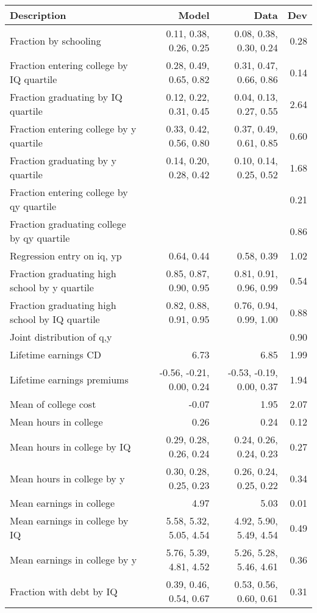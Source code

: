 \begin{tabular}{lrrr}
\hline
Description & Model  & Data  & Dev  \\ 
\hline
Fraction by schooling & 0.11, 0.38, 0.26, 0.25  & 0.08, 0.38, 0.30, 0.24  & 0.28  \\ 
Fraction entering college by IQ quartile & 0.28, 0.49, 0.65, 0.82  & 0.31, 0.47, 0.66, 0.86  & 0.14  \\ 
Fraction graduating by IQ quartile & 0.12, 0.22, 0.31, 0.45  & 0.04, 0.13, 0.27, 0.55  & 2.64  \\ 
Fraction entering college by y quartile & 0.33, 0.42, 0.56, 0.80  & 0.37, 0.49, 0.61, 0.85  & 0.60  \\ 
Fraction graduating by y quartile & 0.14, 0.20, 0.28, 0.42  & 0.10, 0.14, 0.25, 0.52  & 1.68  \\ 
Fraction entering college by qy quartile &   &   & 0.21  \\ 
Fraction graduating college by qy quartile &   &   & 0.86  \\ 
Regression entry on iq, yp & 0.64, 0.44  & 0.58, 0.39  & 1.02  \\ 
Fraction graduating high school by y quartile & 0.85, 0.87, 0.90, 0.95  & 0.81, 0.91, 0.96, 0.99  & 0.54  \\ 
Fraction graduating high school by IQ quartile & 0.82, 0.88, 0.91, 0.95  & 0.76, 0.94, 0.99, 1.00  & 0.88  \\ 
Joint distribution of q,y &   &   & 0.90  \\ 
Lifetime earnings CD & 6.73  & 6.85  & 1.99  \\ 
Lifetime earnings premiums & -0.56, -0.21, 0.00, 0.24  & -0.53, -0.19, 0.00, 0.37  & 1.94  \\ 
Mean of college cost & -0.07  & 1.95  & 2.07  \\ 
Mean hours in college & 0.26  & 0.24  & 0.12  \\ 
Mean hours in college by IQ & 0.29, 0.28, 0.26, 0.24  & 0.24, 0.26, 0.24, 0.23  & 0.27  \\ 
Mean hours in college by y & 0.30, 0.28, 0.25, 0.23  & 0.26, 0.24, 0.25, 0.22  & 0.34  \\ 
Mean earnings in college & 4.97  & 5.03  & 0.01  \\ 
Mean earnings in college by IQ & 5.58, 5.32, 5.05, 4.54  & 4.92, 5.90, 5.49, 4.54  & 0.49  \\ 
Mean earnings in college by y & 5.76, 5.39, 4.81, 4.52  & 5.26, 5.28, 5.46, 4.61  & 0.36  \\ 
Fraction with debt by IQ & 0.39, 0.46, 0.54, 0.67  & 0.53, 0.56, 0.60, 0.61  & 0.31  \\ 

\end{tabular}
